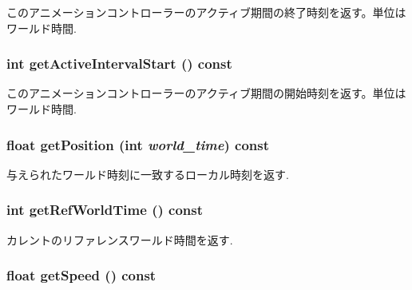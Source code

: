 このアニメーションコントローラーのアクティブ期間の終了時刻を返す。単位はワールド時間. \hypertarget{classm3g_1_1AnimationController_c66e837ae4152477eabdfcbe7fb21adb}{
\subsubsection[{getActiveIntervalStart}]{\setlength{\rightskip}{0pt plus 5cm}int getActiveIntervalStart () const}}
\label{classm3g_1_1AnimationController_c66e837ae4152477eabdfcbe7fb21adb}


このアニメーションコントローラーのアクティブ期間の開始時刻を返す。単位はワールド時間. \hypertarget{classm3g_1_1AnimationController_dfdea73153cb34c26979575efda149e2}{
\subsubsection[{getPosition}]{\setlength{\rightskip}{0pt plus 5cm}float getPosition (int {\em world\_\-time}) const}}
\label{classm3g_1_1AnimationController_dfdea73153cb34c26979575efda149e2}


与えられたワールド時刻に一致するローカル時刻を返す. \hypertarget{classm3g_1_1AnimationController_103e1bd81eba2cc90f31e7fdc4f3c601}{
\subsubsection[{getRefWorldTime}]{\setlength{\rightskip}{0pt plus 5cm}int getRefWorldTime () const}}
\label{classm3g_1_1AnimationController_103e1bd81eba2cc90f31e7fdc4f3c601}


カレントのリファレンスワールド時間を返す. \hypertarget{classm3g_1_1AnimationController_4ab87c5df7c3eadd17b318a426773fcb}{
\subsubsection[{getSpeed}]{\setlength{\rightskip}{0pt plus 5cm}float getSpeed () const}}
\label{classm3g_1_1AnimationController_4ab87c5df7c3eadd17b318a426773fcb}


